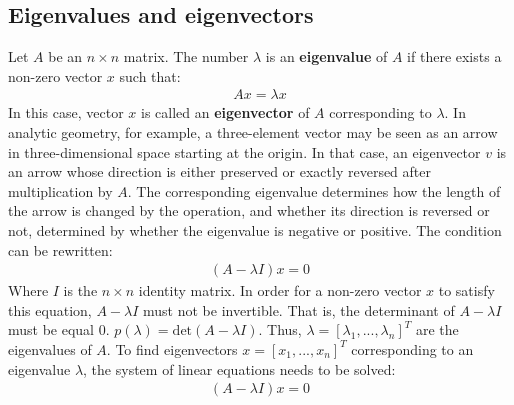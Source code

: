 \documentclass{report}
\begin{document}
\subsection{Eigenvalues and eigenvectors}
Let $A$ be an $n\times n$ matrix. The number $\lambda$ is an {\bf eigenvalue} of $A$ if there exists a non-zero vector $x$ such that:
\begin{align*}
Ax = \lambda x
\end{align*}
In this case, vector $x$ is called an {\bf eigenvector} of $A$ corresponding to $\lambda$. In analytic geometry, for example, a three-element vector may be seen as an arrow in three-dimensional space starting at the origin. In that case, an eigenvector $v$ is an arrow whose direction is either preserved or exactly reversed after multiplication by $A$. The corresponding eigenvalue determines how the length of the arrow is changed by the operation, and whether its direction is reversed or not, determined by whether the eigenvalue is negative or positive. The condition can be rewritten:
\begin{align*}
(A -\lambda I)x = 0
\end{align*}
Where $I$ is the $n\times n$ identity matrix. In order for a non-zero vector $x$ to satisfy this equation, $A -\lambda I$ must not be invertible. That is, the determinant of $A -\lambda I$ must be equal $0$. $p(\lambda)=\mbox{det}(A -\lambda I)$. Thus, $\lambda = [\lambda_1, ..., \lambda_n]^T$ are the eigenvalues of $A$. To find eigenvectors $x = [x_1,...,x_n]^T$ corresponding to an eigenvalue $\lambda$, the system of linear equations needs to be solved:
\begin{align*}
(A -\lambda I)x = 0
\end{align*}
\end{document}
